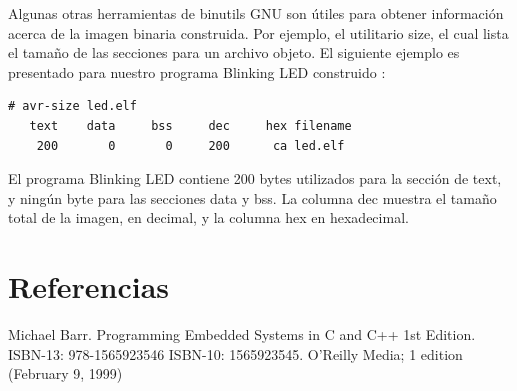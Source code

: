 \documentclass[12pt]{article}
\begin{document}
Algunas otras herramientas de binutils GNU son útiles para obtener 
información acerca de la imagen binaria construida.
Por ejemplo, el utilitario size, el cual lista el tamaño de las secciones
para un archivo objeto. El siguiente ejemplo es presentado
para nuestro programa Blinking LED construido :

\begin{verbatim}
# avr-size led.elf
   text	   data	    bss	    dec	    hex	filename
    200	      0	      0	    200	     ca	led.elf
\end{verbatim}

El programa Blinking LED contiene 200 bytes utilizados para la sección de text, y
ningún byte para las secciones data y bss. La columna dec muestra el tamaño
total de la imagen, en decimal, y la columna hex en hexadecimal.





\section*{Referencias}

Michael Barr. Programming Embedded Systems in C and C++ 1st Edition. ISBN-13: 978-1565923546
ISBN-10: 1565923545. O'Reilly Media; 1 edition (February 9, 1999)



\end{document}
